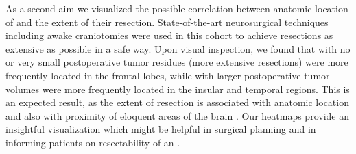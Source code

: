 As a second aim we visualized the possible correlation between anatomic location of  and the extent of their resection.
State-of-the-art neurosurgical techniques including awake craniotomies were used in this cohort to achieve resections as extensive as possible in a safe way.
Upon visual inspection, we found that  with no or very small postoperative \gls{tumor} residues (more extensive resections) were more frequently located in the frontal lobes, while  with larger postoperative \gls{tumor} volumes were more frequently located in the insular and temporal regions.
This is an expected result, as the extent of resection is associated with anatomic location and also with proximity of eloquent areas of the brain \autocite{wijnenga2017impact}.
Our heatmaps provide an insightful visualization which might be helpful in surgical planning and in informing patients on resectability of an .

